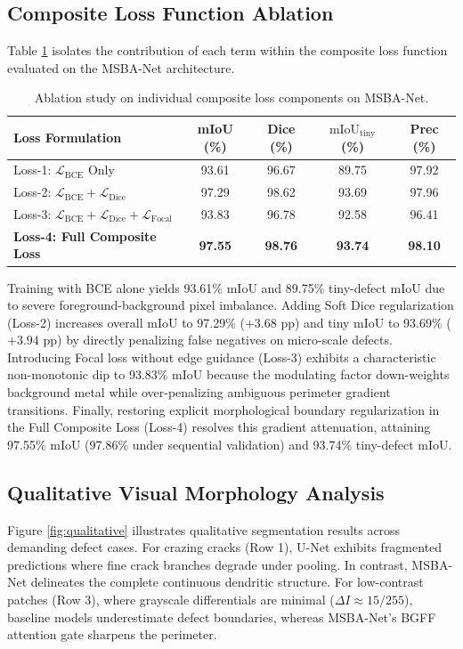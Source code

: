\documentclass{ieeeaccess}
\begin{document}
\subsection{Composite Loss Function Ablation}
Table \ref{tab:loss_ablation} isolates the contribution of each term within the composite loss function evaluated on the MSBA-Net architecture.

\begin{table}[!t]
\centering
\setlength{\tabcolsep}{1.8pt}
\fontsize{6.8pt}{8.8pt}\selectfont
\caption{Ablation study on individual composite loss components on MSBA-Net.}
\label{tab:loss_ablation}
\begin{tabular*}{\columnwidth}{@{\extracolsep{\fill}}lcccc@{}}
\toprule
\textbf{Loss Formulation} & \textbf{mIoU (\%)} & \textbf{Dice (\%)} & $\text{mIoU}_{\text{tiny}}$ \textbf{(\%)} & \textbf{Prec (\%)} \\
\midrule
Loss-1: $\mathcal{L}_{\text{BCE}}$ Only & 93.61 & 96.67 & 89.75 & 97.92 \\
Loss-2: $\mathcal{L}_{\text{BCE}} + \mathcal{L}_{\text{Dice}}$ & 97.29 & 98.62 & 93.69 & 97.96 \\
Loss-3: $\mathcal{L}_{\text{BCE}} + \mathcal{L}_{\text{Dice}} + \mathcal{L}_{\text{Focal}}$ & 93.83 & 96.78 & 92.58 & 96.41 \\
\textbf{Loss-4: Full Composite Loss} & \textbf{97.55} & \textbf{98.76} & \textbf{93.74} & \textbf{98.10} \\
\bottomrule
\end{tabular*}
\end{table}

Training with BCE alone yields 93.61\% mIoU and 89.75\% tiny-defect mIoU due to severe foreground-background pixel imbalance. Adding Soft Dice regularization (Loss-2) increases overall mIoU to 97.29\% ($+3.68\text{ pp}$) and tiny mIoU to 93.69\% ($+3.94\text{ pp}$) by directly penalizing false negatives on micro-scale defects. Introducing Focal loss without edge guidance (Loss-3) exhibits a characteristic non-monotonic dip to 93.83\% mIoU because the modulating factor down-weights background metal while over-penalizing ambiguous perimeter gradient transitions. Finally, restoring explicit morphological boundary regularization in the Full Composite Loss (Loss-4) resolves this gradient attenuation, attaining 97.55\% mIoU (97.86\% under sequential validation) and 93.74\% tiny-defect mIoU.
\subsection{Qualitative Visual Morphology Analysis}
Figure \ref{fig:qualitative} illustrates qualitative segmentation results across demanding defect cases. For crazing cracks (Row 1), U-Net exhibits fragmented predictions where fine crack branches degrade under pooling. In contrast, MSBA-Net delineates the complete continuous dendritic structure. For low-contrast patches (Row 3), where grayscale differentials are minimal ($\Delta I \approx 15/255$), baseline models underestimate defect boundaries, whereas MSBA-Net's BGFF attention gate sharpens the perimeter.
\end{document}
